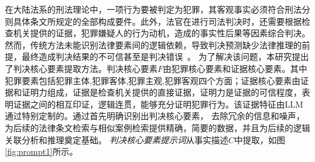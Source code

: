 在大陆法系的刑法理论中，一项行为要被判定为犯罪，其客观事实必须符合刑法分则具体条文所规定的全部构成要件。此外，法官在进行司法判决时，还需要根据检查机关提供的证据，犯罪嫌疑人的行为动机，造成的事实性后果等因素综合判决。然而，传统方法未能识别法律要素间的逻辑依赖，导致判决预测缺少法律推理的前提，最终造成判决结果的不可信甚至是判决错误~\cite{JSJA202505027,zhao2022charge,zhao2022charge}。
为了解决该问题，本研究提出了判决核心要素提取方法。判决核心要素$F$由犯罪核心要素和证据核心要素。其中犯罪要素包括犯罪主体,犯罪客体,犯罪主观,犯罪客观四个方面；证据核心要素由证据和证明力组成，证据是检查机关提供的直接证据，证明力是证据的可信程度，表明证据之间的相互印证，逻辑连贯，能够充分证明犯罪行为。该证据特征由LLM通过特别定制的。通过首先明确识别出判决核心要素， 去除冗余的信息和噪声，为后续的法律条文检索与相似案例检索提供精确，简要的数据，并且为后续的逻辑关联分析和推理奠定基础。
\textit{判决核心要素提示词}从事实描述$C$中提取，如图\ref{fig:prompt1}所示。

